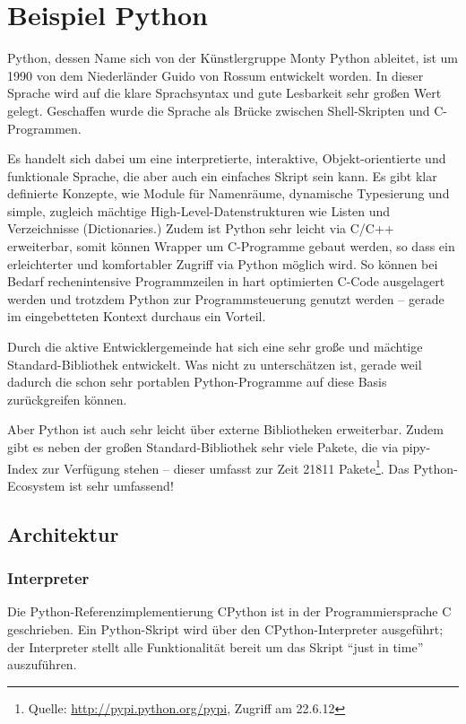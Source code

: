 \section{Beispiel Python}


Python, dessen Name sich von der Künstlergruppe Monty Python ableitet, ist um
1990 von dem Niederländer Guido von Rossum entwickelt worden. In dieser
Sprache wird auf die klare Sprachsyntax und gute Lesbarkeit sehr großen Wert
gelegt. Geschaffen wurde die Sprache als Brücke zwischen Shell-Skripten und
C-Programmen.

Es handelt sich dabei um eine interpretierte, interaktive, Objekt-orientierte
und funktionale Sprache, die aber auch ein einfaches Skript sein kann. Es gibt
klar definierte Konzepte, wie Module für Namenräume, dynamische Typesierung
und simple, zugleich mächtige High-Level-Datenstrukturen wie Listen und
Verzeichnisse (Dictionaries.) Zudem ist Python sehr leicht via C/C++
erweiterbar, somit können Wrapper um C-Programme gebaut werden, so dass ein
erleichterter und komfortabler Zugriff via Python möglich wird. So können bei
Bedarf rechen\-inten\-sive Programmzeilen in hart optimierten C-Code ausgelagert
werden und trotzdem Python zur Programmsteuerung genutzt werden -- gerade im
eingebetteten Kontext durchaus ein Vorteil.

Durch die aktive Entwicklergemeinde hat sich eine sehr große und mächtige
Standard-Bibliothek entwickelt.\cite{pyref-library} Was nicht zu
unterschätzen ist, gerade weil dadurch die schon sehr portablen
Python-Programme auf diese Basis zurückgreifen können.

Aber Python ist auch sehr leicht über externe Bibliotheken erweiterbar.
Zudem gibt es neben der großen Standard-Bibliothek sehr viele Pakete, die via
pipy-Index zur Verfügung stehen -- dieser umfasst zur Zeit 21811
Pakete\footnote{Quelle: \url{http://pypi.python.org/pypi}, Zugriff am 22.6.12}.
Das Python-Ecosystem ist sehr umfassend!


\subsection{Architektur}\label{sec:python_arch}


\subsubsection{Interpreter}


Die Python-Referenzimplementierung CPython ist in der Programmiersprache C
geschrieben. Ein Python-Skript wird über den CPython-Interpreter ausgeführt;
der Interpreter stellt alle Funktionalität bereit um das Skript “just in time”
auszuführen.

